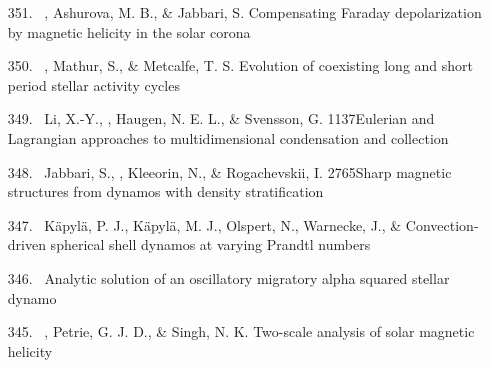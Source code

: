 \begin{itemize}
\item[{351.}~]
\Brandenburg, Ashurova, M. B., \& Jabbari, S.
{Compensating Faraday depolarization by magnetic helicity in the solar corona}

\item[{350.}~]
\Brandenburg, Mathur, S., \& Metcalfe, T. S.
{Evolution of coexisting long and short period stellar activity cycles}

\item[{349.}~]
Li, X.-Y., \Brandenburg, Haugen, N. E. L., \& Svensson, G.
{1137}{Eulerian and Lagrangian approaches to multidimensional condensation and collection}

\item[{348.}~]
Jabbari, S., \Brandenburg, Kleeorin, N., \& Rogachevskii, I.
{2765}{Sharp magnetic structures from dynamos with density stratification}

\item[{347.}~]
K\"apyl\"a, P. J., K\"apyl\"a, M. J., Olspert, N., Warnecke, J., \& \Brandenburg{}
{Convection-driven spherical shell dynamos at varying Prandtl numbers}

\item[{346.}~]
\Brandenburg{}
{Analytic solution of an oscillatory migratory alpha squared stellar dynamo}

\item[{345.}~]
\Brandenburg, Petrie, G. J. D., \& Singh, N. K.
{Two-scale analysis of solar magnetic helicity}


\end{itemize}
